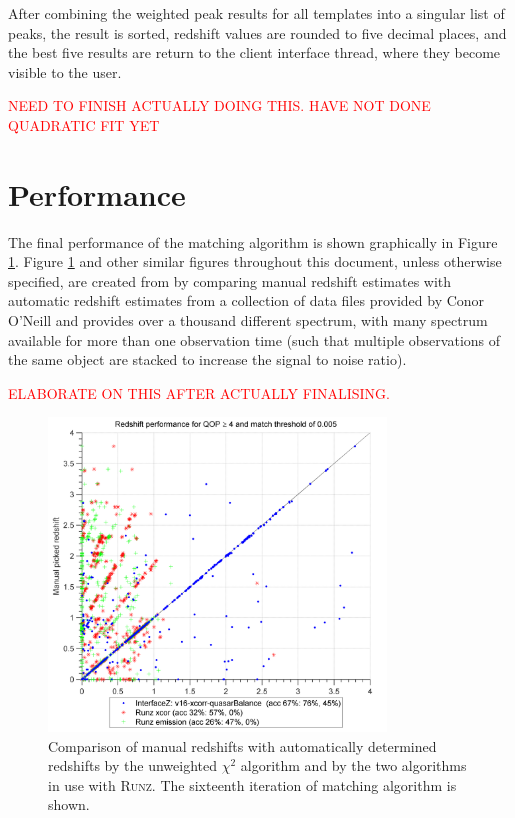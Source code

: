 \documentclass[titlesmallcaps, examinerscopy, copyrightpage]{uqthesis}
\newcommand{\runz}{\textsc{Runz}}
\begin{document}
After combining the weighted peak results for all templates into a singular list of peaks, the result is sorted, redshift values are rounded to five decimal places, and the best five results are return to the client interface thread, where they become visible to the user.

\textcolor{red}{NEED TO FINISH ACTUALLY DOING THIS. HAVE NOT DONE QUADRATIC FIT YET}

\section{Performance} \label{sec:performance}

The final performance of the matching algorithm is shown graphically in Figure \ref{fig:final}. Figure \ref{fig:final} and other similar figures throughout this document, unless otherwise specified, are created from by comparing manual redshift estimates with automatic redshift estimates from a collection of data files provided by Conor O'Neill and provides over a thousand different spectrum, with many spectrum available for more than one observation time (such that multiple observations of the same object are stacked to increase the signal to noise ratio). 

\textcolor{red}{ELABORATE ON THIS AFTER ACTUALLY FINALISING.}


\begin{figure}[ht!]
\includegraphics[width=0.8\textwidth]{images/final.png} 
\centering
\caption{Comparison of manual redshifts with automatically determined redshifts by the unweighted $\chi^2$ algorithm and by the two algorithms in use with \runz{}. The sixteenth iteration of matching algorithm is shown.}
\label{fig:final}
\end{figure}
\end{document}
